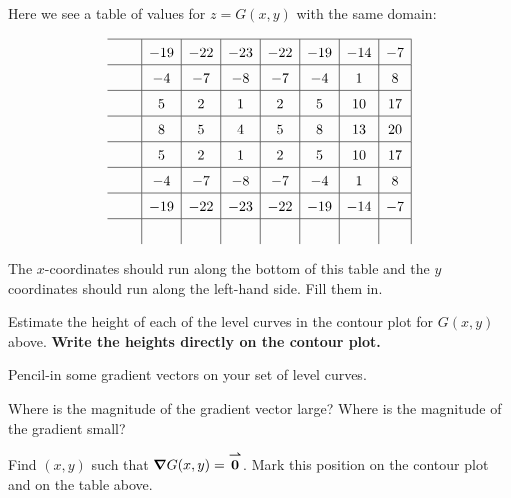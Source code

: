 \documentclass[handout,noauthor,nooutcomes]{ximera}
\begin{document}
\begin{problem}
Here we see a table of values for $z= G(x,y)$ with the same domain:

\[
\renewcommand*{\arraystretch}{1.5}
\begin{array}{c|c|c|c|c|c|c|c|}\hline
\rule{.5cm}{0cm}& -19 & -22 & -23 & -22 & -19 & -14 & -7 \\\hline
& -4 & -7 & -8 & -7 & -4 & 1 & 8 \\\hline
& 5 & 2 & 1 & 2 & 5 & 10 & 17 \\\hline
& 8 & 5 & 4 & 5 & 8 & 13 & 20 \\\hline
& 5 & 2 & 1 & 2 & 5 & 10 & 17 \\\hline
& -4 & -7 & -8 & -7 & -4 & 1 & 8 \\\hline
& -19 & -22 & -23 & -22 & -19 & -14 & -7 \\\hline
  &    &    &    &    &   &    & 
\end{array}
\]

The $x$-coordinates should run along the bottom of this table and the
$y$ coordinates should run along the left-hand side. Fill them in.
\end{problem}

\begin{problem}
Estimate the height of each of the level curves in the contour plot
for $G(x,y)$ above. \textbf{Write the heights directly on the contour
  plot.}
\end{problem}

\begin{problem}
  Pencil-in some gradient vectors on your set of level curves. 
\end{problem}


\begin{problem}
  Where is the magnitude of the gradient vector large? Where is the
  magnitude of the gradient small?
\end{problem}


\begin{problem}
Find $(x,y)$ such that $\boldsymbol\nabla G(x,y) = {\overset{\boldsymbol{\rightharpoonup}}{\mathbf{0}}}$. Mark this position on the
contour plot and on the table above. %
\end{problem}









\end{document}
